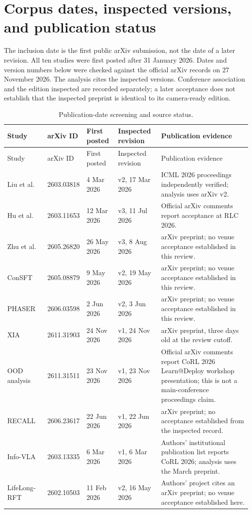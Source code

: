 \appendix
\section{Corpus dates, inspected versions, and publication status}
\label{app:corpus}
The inclusion date is the first public arXiv submission, not the date of a later revision. All ten studies were first posted after 31 January 2026. Dates and version numbers below were checked against the official arXiv records on 27 November 2026. The analysis cites the inspected versions. Conference association and the edition inspected are recorded separately; a later acceptance does not establish that the inspected preprint is identical to its camera-ready edition.

\begingroup
\footnotesize
\setlength{\tabcolsep}{4pt}
\begin{longtable}{@{}p{24mm}p{24mm}p{22mm}p{22mm}p{46mm}@{}}
\caption{Publication-date screening and source status.}\label{tab:corpus}\\
\toprule
Study & arXiv ID & First posted & Inspected revision & Publication evidence\\
\midrule
\endfirsthead
\toprule
Study & arXiv ID & First posted & Inspected revision & Publication evidence\\
\midrule
\endhead
\bottomrule
\endfoot
Liu et al.\ \cite{liu_er} & 2603.03818 & 4 Mar 2026 & v2, 17 Mar 2026 & ICML 2026 proceedings independently verified; analysis uses arXiv v2.\\
Hu et al.\ \cite{hu_rl} & 2603.11653 & 12 Mar 2026 & v3, 11 Jul 2026 & Official arXiv comments report acceptance at RLC 2026.\\
Zhu et al.\ \cite{zhu_real} & 2605.26820 & 26 May 2026 & v3, 8 Aug 2026 & arXiv preprint; no venue acceptance established in this review.\\
ConSFT\ \cite{consft} & 2605.08879 & 9 May 2026 & v2, 19 May 2026 & arXiv preprint; no venue acceptance established in this review.\\
PHASER\ \cite{phaser} & 2606.03598 & 2 Jun 2026 & v2, 3 Jun 2026 & arXiv preprint; no venue acceptance established in this review.\\
XIA\ \cite{xia} & 2611.31903 & 24 Nov 2026 & v1, 24 Nov 2026 & arXiv preprint, three days old at the review cutoff.\\
OOD analysis\ \cite{ood} & 2611.31511 & 23 Nov 2026 & v1, 23 Nov 2026 & Official arXiv comments report CoRL 2026 Learn@Deploy workshop presentation; this is not a main-conference proceedings claim.\\
RECALL\ \cite{recall} & 2606.23617 & 22 Jun 2026 & v1, 22 Jun 2026 & arXiv preprint; no acceptance established from the inspected record.\\
Info-VLA\ \cite{info} & 2603.13335 & 6 Mar 2026 & v1, 6 Mar 2026 & Authors' institutional publication list reports CoRL 2026; analysis uses the March preprint.\\
LifeLong-RFT\ \cite{lifelong} & 2602.10503 & 11 Feb 2026 & v2, 16 May 2026 & Authors' project cites an arXiv preprint; no venue acceptance established here.\\
\end{longtable}
\endgroup

